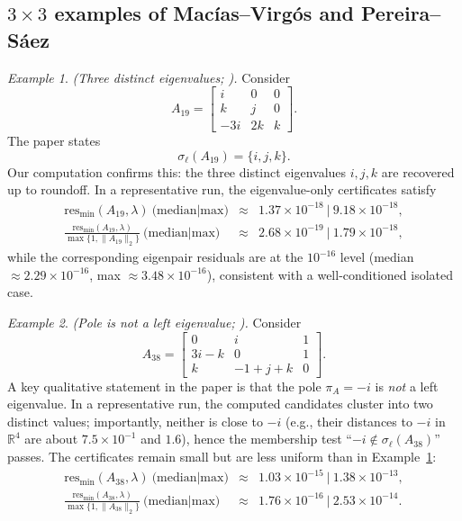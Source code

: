 \documentclass[preprint,12pt]{elsarticle}  %
\theoremstyle{definition}
\theoremstyle{definition}
\theoremstyle{definition}
\theoremstyle{definition}
\theoremstyle{definition}
\theoremstyle{remark}
\theoremstyle{remark}
\newtheorem{Ex}{Example}
\theoremstyle{remark}
\DeclareRobustCommand{\i}{\ensuremath{\mathbf{i}}}
\DeclareRobustCommand{\j}{\ensuremath{\mathbf{j}}}
\DeclareRobustCommand{\k}{\ensuremath{\mathbf{k}}}
\def\i{i}\def\j{j}\def\k{k}%
\newcommand{\RR}{\mathbb{R}}
\begin{document}
\subsection{\texorpdfstring{$3\times3$}{3x3} examples of Mac\'ias--Virg\'os and Pereira--S\'aez}
\label{subsec:examples_mvps}
\begin{Ex}\label{ex:MVPS_19}
\emph{(Three distinct eigenvalues; \cite[Ex.~19]{MaciasVirgosPereiraSaez2014}).}
Consider
\[
A_{19}=
\begin{bmatrix}
\i & 0 & 0\\
\k & \j & 0\\
-3\i & 2\k & \k
\end{bmatrix}.
\]
The paper states
\[
\sigma_\ell(A_{19})=\{\i,\j,\k\}.
\]
Our computation confirms this: the three distinct eigenvalues $\i,\j,\k$ are recovered up to roundoff.
In a representative run, the eigenvalue-only certificates satisfy
\[
\begin{array}{rcl}
\mathrm{res}_{\min}(A_{19},\lambda)\ \text{(median|max)} 
&\approx& 
1.37\times10^{-18}\ \big|\ 9.18\times10^{-18},
\\[2mm]
\frac{\mathrm{res}_{\min}(A_{19},\lambda)}{\max\{1,\|A_{19}\|_2\}}\ \text{(median|max)}
&\approx&
2.68\times10^{-19}\ \big|\ 1.79\times10^{-18},
\end{array}
\]
while the corresponding eigenpair residuals are at the $10^{-16}$ level
(median $\approx 2.29\times10^{-16}$, max $\approx 3.48\times10^{-16}$), consistent with a well-conditioned isolated case.
\end{Ex}

\begin{Ex}\label{ex:MVPS_38}
\emph{(Pole is not a left eigenvalue; \cite[Ex.~38]{MaciasVirgosPereiraSaez2014}).}
Consider
\[
A_{38}=
\begin{bmatrix}
0 & \i & 1\\
3\i-\k & 0 & 1\\
\k & -1+\j+\k & 0
\end{bmatrix}.
\]
A key qualitative statement in the paper is that the pole $\pi_A=-\i$ is \emph{not} a left eigenvalue.
In a representative run, the computed candidates cluster into two distinct values; importantly, neither is close to $-\i$
(e.g., their distances to $-\i$ in $\RR^4$ are about $7.5\times10^{-1}$ and $1.6$), hence the membership test
``$-\i\notin\sigma_\ell(A_{38})$'' passes.
The certificates remain small but are less uniform than in Example~\ref{ex:MVPS_19}:
\[
\begin{array}{rcl}
\mathrm{res}_{\min}(A_{38},\lambda)\ \text{(median|max)}&\approx& 1.03\times10^{-15}\ \big|\ 1.38\times10^{-13},
\\[2mm]
\frac{\mathrm{res}_{\min}(A_{38},\lambda)}{\max\{1,\|A_{38}\|_2\}}\ \text{(median|max)}&\approx& 1.76\times10^{-16}\ \big|\ 2.53\times10^{-14}.
\end{array}
\]
\end{Ex}
\end{document}
